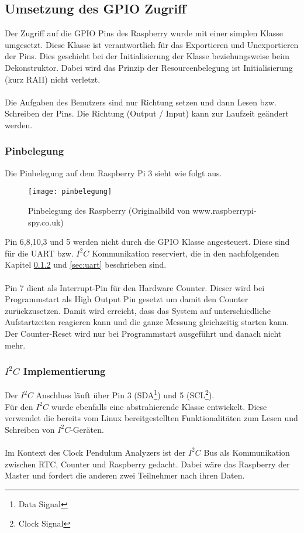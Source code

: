 \subsection{Umsetzung des GPIO Zugriff}
Der Zugriff auf die GPIO Pins des Raspberry wurde mit einer simplen Klasse umgesetzt. Diese Klasse ist verantwortlich für das Exportieren und Unexportieren der Pins. Dies geschieht bei der Initialisierung der Klasse beziehungsweise beim Dekonstruktor. Dabei wird das Prinzip der Resourcenbelegung ist Initialisierung (kurz RAII) nicht verletzt.\\
\\
Die Aufgaben des Benutzers sind nur Richtung setzen und dann Lesen bzw. Schreiben der Pins. Die Richtung (Output / Input) kann zur Laufzeit geändert werden.

\subsubsection{Pinbelegung}
Die Pinbelegung auf dem Raspberry Pi 3 sieht wie folgt aus.
\begin{figure}[H]
    \centering
    \texttt{[image: pinbelegung]}
    \caption{Pinbelegung des Raspberry (Originalbild von www.raspberrypi-spy.co.uk)}
\end{figure}

\noindent Pin 6,8,10,3 und 5 werden nicht durch die GPIO Klasse angesteuert. Diese sind für die UART bzw. $I^2C$ Kommunikation reserviert, die in den nachfolgenden Kapitel \ref{sec:i2c} und \ref{sec:uart} beschrieben sind.\\\\
Pin 7 dient als Interrupt-Pin für den Hardware Counter. Dieser wird bei Programmstart als High Output Pin gesetzt um damit den Counter zurückzusetzen. Damit wird erreicht, dass das System auf unterschiedliche Aufstartzeiten reagieren kann und die ganze Messung gleichzeitig starten kann. Der Counter-Reset wird nur bei Programmstart ausgeführt und danach nicht mehr.

\subsubsection{$I^2C$ Implementierung}\label{sec:i2c}
Der $I^2C$ Anschluss läuft über Pin 3 (SDA\footnote{Data Signal}) und 5 (SCL\footnote{Clock Signal}).\\
Für den $I^2C$ wurde ebenfalls eine abstrahierende Klasse entwickelt. Diese verwendet die bereits vom Linux bereitgestellten Funktionalitäten zum Lesen und Schreiben von $I^2C$-Geräten.\\
\\
Im Kontext des Clock Pendulum Analyzers ist der $I^2C$ Bus als Kommunikation zwischen RTC, Counter und Raspberry gedacht. 
Dabei wäre das Raspberry der Master und fordert die anderen zwei Teilnehmer nach ihren Daten.

